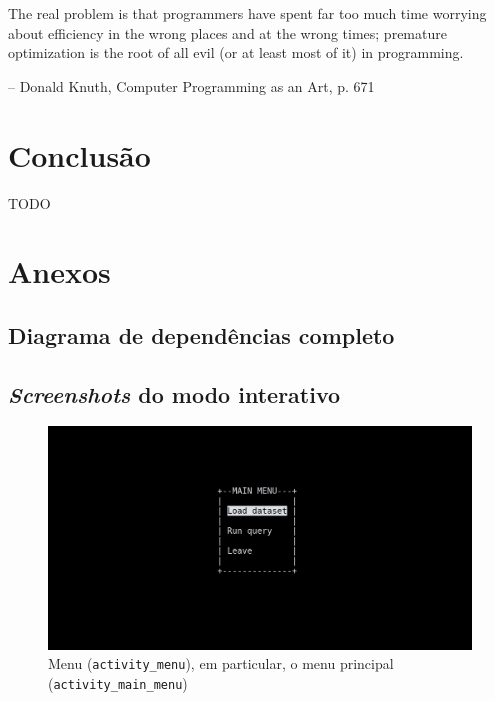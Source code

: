 \documentclass[12pt, a4paper]{article}
\begin{document}
\hspace{1cm}\parbox{15cm}{\small
    The real problem is that programmers have spent far too much time worrying about efficiency in
    the wrong places and at the wrong times; premature optimization is the root of all evil (or at
    least most of it) in programming.

    \begin{flushright}
        -- Donald Knuth, Computer Programming as an Art, p. 671
    \end{flushright}
}

\section{Conclusão}
\label{sec:conclusion}

{\color{red} TODO}

\pagebreak
\section{Anexos}
\label{sec:annexes}

\subsection{Diagrama de dependências completo}
\label{sec:complete-diagram}


\subsection{\emph{Screenshots} do modo interativo}
\label{sec:interactive-screenshots}

\begin{figure}[H]
    \centering
    \includegraphics[scale=0.25]{res-fase2/interactive_screenshots/main_menu.png}
    \caption{Menu (\texttt{activity\_menu}), em particular, o menu principal
             (\texttt{activity\_main\_menu})}
    \label{fig:main_menu}
\end{figure}
\end{document}
